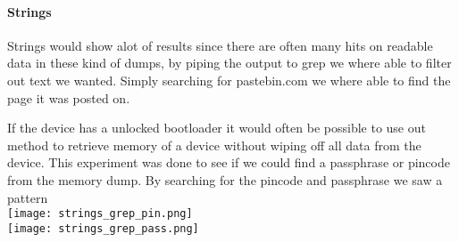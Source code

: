   \paragraph{Strings}
  Strings would show alot of results since there are often many hits on readable 
  data in these kind of dumps, by piping the output to grep we where able to 
  filter out text we wanted. Simply searching for pastebin.com we where able to 
  find the page it was posted on. 
 

If the device has a unlocked bootloader it would often be possible to use out 
method to retrieve memory of a device without wiping off all data from the 
device. This experiment was done to see if we could find a passphrase or 
pincode from the memory dump.
  By searching for the pincode and passphrase we saw a pattern \\
\texttt{[image: strings\_grep\_pin.png]}\\


\texttt{[image: strings\_grep\_pass.png]}

